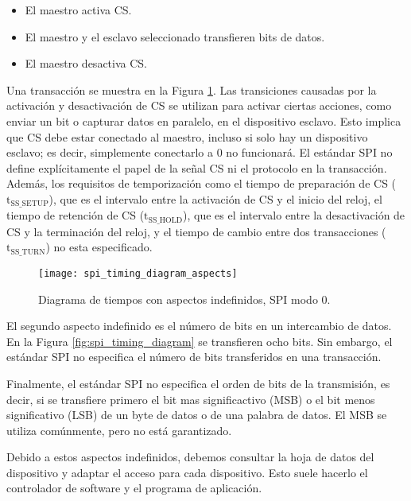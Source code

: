     \begin{itemize}
      \item El maestro activa CS.
      \item El maestro y el esclavo seleccionado transfieren bits de datos.
      \item El maestro desactiva CS.
    \end{itemize}

    Una transacción se muestra en la Figura \ref{fig:spi_timing_diagram_aspects}. Las transiciones causadas por la activación y desactivación de CS se utilizan para activar ciertas acciones, como enviar un bit o capturar datos en paralelo, en el dispositivo esclavo. Esto implica que CS debe estar conectado al maestro, incluso si solo hay un dispositivo esclavo; es decir, simplemente conectarlo a 0 no funcionará. El estándar SPI no define explícitamente el papel de la señal CS ni el protocolo en la transacción. Además, los requisitos de temporización como el tiempo de preparación de CS ($\text{t}_{\text{SS\_SETUP}}$), que es el intervalo entre la activación de CS y el inicio del reloj, el tiempo de retención de CS ($\text{t}_{\text{SS\_HOLD}}$), que es el intervalo entre la desactivación de CS y la terminación del reloj, y el tiempo de cambio entre dos transacciones ($\text{t}_{\text{SS\_TURN}}$) no esta especificado.

    \begin{figure}[!h]
      \centering
      \texttt{[image: spi\_timing\_diagram\_aspects]}
      \caption{Diagrama de tiempos con aspectos indefinidos, SPI modo 0.}
      \label{fig:spi_timing_diagram_aspects}
    \end{figure}

    El segundo aspecto indefinido es el número de bits en un intercambio de datos. En la Figura \ref{fig:spi_timing_diagram} se transfieren ocho bits. Sin embargo, el estándar SPI no especifica el número de bits transferidos en una transacción.

    Finalmente, el estándar SPI no especifica el orden de bits de la transmisión, es decir, si se transfiere primero el bit mas significactivo (MSB) o el bit menos significativo (LSB) de un byte de datos o de una palabra de datos. El MSB se utiliza comúnmente, pero no está garantizado.

    Debido a estos aspectos indefinidos, debemos consultar la hoja de datos del dispositivo y adaptar el acceso para cada dispositivo. Esto suele hacerlo el controlador de software y el programa de aplicación.


